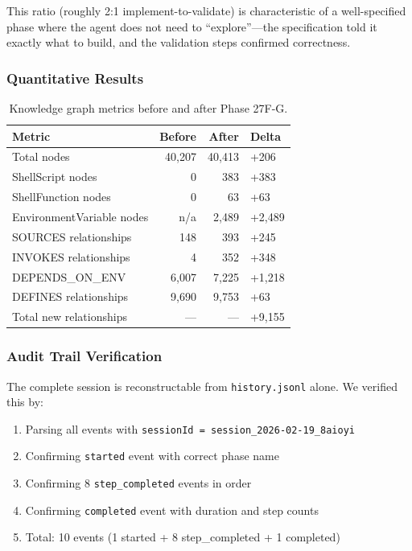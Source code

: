 \documentclass[11pt,letterpaper]{article}
\begin{document}
This ratio (roughly 2:1 implement-to-validate) is characteristic of a
well-specified phase where the agent does not need to ``explore''---the
specification told it exactly what to build, and the validation steps
confirmed correctness.

\subsubsection{Quantitative Results}

\begin{table}[h]
\centering
\caption{Knowledge graph metrics before and after Phase 27F-G.}
\label{tab:metrics}
\begin{tabular}{@{}lrrl@{}}
\toprule
\textbf{Metric} & \textbf{Before} & \textbf{After} & \textbf{Delta} \\
\midrule
Total nodes              & 40{,}207 & 40{,}413 & +206 \\
ShellScript nodes        & 0        & 383      & +383 \\
ShellFunction nodes      & 0        & 63       & +63  \\
EnvironmentVariable nodes& n/a      & 2{,}489  & +2{,}489 \\
SOURCES relationships     & 148      & 393      & +245 \\
INVOKES relationships     & 4        & 352      & +348 \\
DEPENDS\_ON\_ENV          & 6{,}007  & 7{,}225  & +1{,}218 \\
DEFINES relationships     & 9{,}690  & 9{,}753  & +63  \\
Total new relationships  & ---      & ---      & +9{,}155 \\
\bottomrule
\end{tabular}
\end{table}

\subsubsection{Audit Trail Verification}

The complete session is reconstructable from \texttt{history.jsonl}
alone.  We verified this by:

\begin{enumerate}[nosep]
    \item Parsing all events with \texttt{sessionId =
          session\_2026-02-19\_8aioyi}
    \item Confirming \texttt{started} event with correct phase name
    \item Confirming 8 \texttt{step\_completed} events in order
    \item Confirming \texttt{completed} event with duration and step counts
    \item Total: 10 events (1 started + 8 step\_completed + 1 completed)
\end{enumerate}
\end{document}
